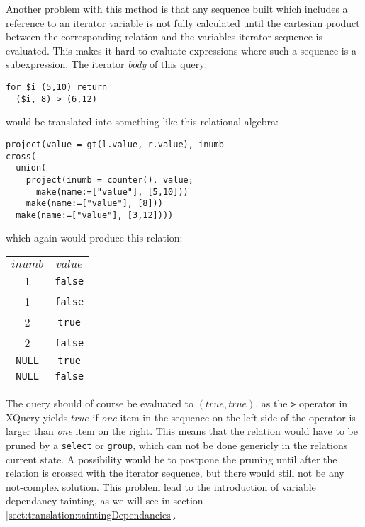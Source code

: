 Another problem with this method is that any sequence built which includes a reference to an iterator variable is
not fully calculated until the cartesian product between the corresponding relation and the variables iterator
sequence is evaluated. This makes it hard to evaluate expressions where such a sequence is a subexpression. The
iterator \textit{body} of this query:

\begin{Verbatim}
for $i (5,10) return
  ($i, 8) > (6,12)
\end{Verbatim}
would be translated into something like this relational algebra:
\begin{Verbatim}
project(value = gt(l.value, r.value), inumb
cross(
  union(
    project(inumb = counter(), value;
      make(name:=["value"], [5,10]))
    make(name:=["value"], [8]))
  make(name:=["value"], [3,12])))
\end{Verbatim}
which again would produce this relation:

\begin{figure*}[!h]
\centering
\begin{tabular}{|c|c|} \hline
$inumb$ & $value$ \\\hline
1 & \texttt{false} \\\hline
1 & \texttt{false} \\\hline
2 & \texttt{true} \\\hline
2 & \texttt{false} \\\hline
\texttt{NULL} & \texttt{true} \\\hline
\texttt{NULL} & \texttt{false} \\\hline
\end{tabular}
\end{figure*}

The query should of course be evaluated to $(true, true)$, as the \texttt{>} operator in XQuery yields $true$ if
\textit{one} item in the sequence on the left side of the operator is larger than \textit{one} item on the right.
This means that the relation would have to be pruned by a \texttt{select} or \texttt{group}, which can not be done
genericly in the relations current state. A possibility would be to postpone the pruning until after the relation
is crossed with the iterator sequence, but there would still not be any not-complex solution. This problem lead to
the introduction of variable dependancy tainting, as we will see in section
\ref{sect:translation:taintingDependancies}.


